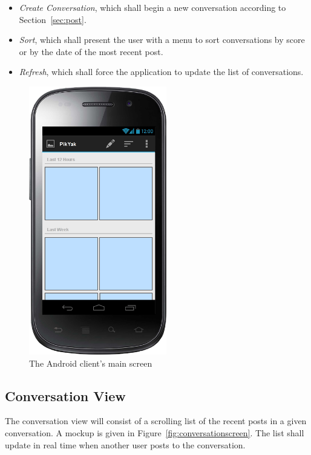 \documentclass[11pt]{scrartcl}
\begin{document}
        \begin{itemize}
            \item \emph{Create Conversation}, which shall begin a new conversation according to Section~\ref{sec:post}.
            \item \emph{Sort}, which shall present the user with a menu to sort conversations by score or by the date of the most recent post.
            \item \emph{Refresh}, which shall force the application to update the list of conversations.
        \end{itemize}

        \begin{figure}[h]
            \centering \includegraphics[width=6cm,keepaspectratio]{mockups/main}
            \caption{The Android client's main screen}
            \label{fig:mainscreen}
        \end{figure}

    \subsection{Conversation View}
    \label{sec:conversation}
        The conversation view will consist of a scrolling list of the recent posts in a given conversation.
        A mockup is given in Figure~\ref{fig:conversationscreen}.
        The list shall update in real time when another user posts to the conversation.
\end{document}
